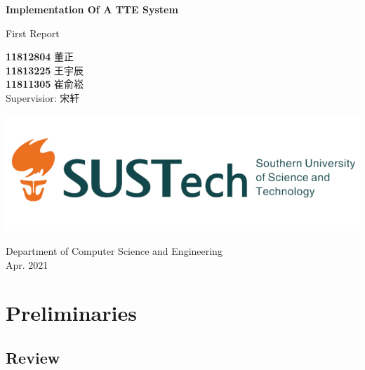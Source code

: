 \documentclass[fontset=none]{ctexart}
\theoremstyle{definition}
\theoremstyle{remark}
\begin{document}
\begin{titlepage}
    \begin{center}
        \vspace*{1cm}
            
        \Huge
        \textbf{Implementation Of A TTE System}
            
        \vspace{0.5cm}
        \LARGE
        First Report\\
            
        \vspace{1.5cm}
            
        \textbf{11812804}  董\quad 正\\
        \textbf{11813225}  王宇辰\\
        \textbf{11811305}  崔俞崧\\

        \vspace{0.5cm}
        Supervisior: 宋轩
            
        \vfill
            
        \includegraphics[width=\textwidth]{images/sustc.png}
            
        \vspace{0.2cm}
            
        \Large
        Department of Computer Science and Engineering\\
        \vspace{0.5cm}
        Apr. 2021
            
    \end{center}
\end{titlepage}

\tableofcontents

\clearpage
\section{Preliminaries}
\subsection{Review}
\end{document}
